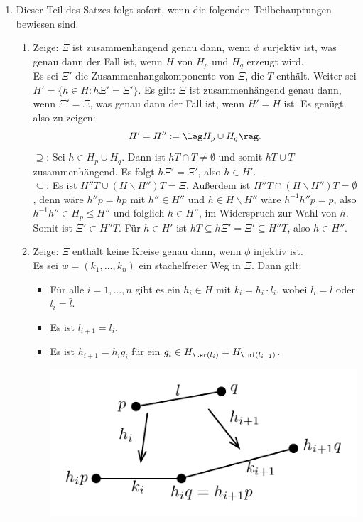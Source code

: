 \bew \begin{enumerate}
\item Dieser Teil des Satzes folgt sofort, wenn die folgenden
Teilbehauptungen bewiesen sind.
\begin{enumerate}
\item Zeige: $\Xi$ ist zusammenhängend genau dann, wenn $\phi$
surjektiv ist, was genau dann der Fall ist, wenn
$H$ von $H_p$ und $H_q$ erzeugt wird.\\
Es sei $\Xi'$ die Zusammenhangskomponente von $\Xi$, die $T$ enthält.
Weiter sei $H'=\{ h\in H : h\Xi' = \Xi' \}$.
Es gilt: $\Xi$ ist zusammenhängend genau dann, wenn $\Xi'=\Xi$, was
genau dann der Fall ist, wenn $H'=H$ ist.
Es genügt also zu zeigen:
\[
H' = H'' := \lag H_p \cup H_q \rag.
\]
\glqq$\supseteq$\grqq:
Sei $h\in H_p\cup H_q$. Dann ist
$hT\cap T\neq\emptyset$ und somit $hT\cup T$ zusammenhängend.
Es folgt $h\Xi'=\Xi'$, also $h\in H'$.\\
\glqq$\subseteq$\grqq:
Es ist $H'' T\cup(H\backslash H'')T= \Xi$. Außerdem ist
$H'' T\cap(H\backslash H'')T = \emptyset$, denn wäre
$h''p=hp$ mit $h''\in H''$ und $h\in H\backslash H''$
wäre $h^{-1}h''p=p$, also $h^{-1}h''\in H_p\leq H''$ und folglich
$h\in H''$, im Widerspruch zur Wahl von $h$.
Somit ist $\Xi'\subset H'' T$. Für $h\in H'$ ist
$hT\subseteq h\Xi'=\Xi'\subseteq H'' T$, also $h\in H''$.
\item Zeige: $\Xi$ enthält keine Kreise genau dann, wenn
$\phi$ injektiv ist.\\
Es sei $w=(k_1,\ldots,k_n)$ ein stachelfreier Weg in $\Xi$.
Dann gilt:
\begin{itemize}
\item Für alle $i=1,\ldots,n$ gibt es ein $h_i\in H$ mit
$k_i=h_i\cdot l_i$, wobei $l_i = l$ oder $l_i = \bar{l}$.
\item Es ist $l_{i+1}=\bar{l}_i$.
\item Es ist $h_{i+1}=h_i g_i$ für ein
$g_i\in H_{\ter(l_i)}=H_{\ini(l_{i+1})}$.
\begin{center}
	\includegraphics{grugraImages/pql}

\end{center}
\end{itemize}
\end{enumerate}
\end{enumerate}
